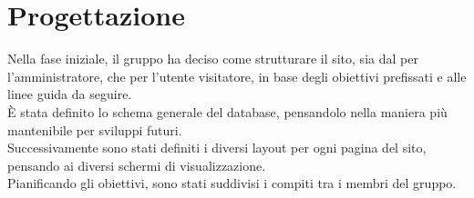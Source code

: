 \section{Progettazione}
Nella fase iniziale, il gruppo ha deciso come strutturare il sito, sia dal per l'amministratore, che per l'utente visitatore, in base degli obiettivi prefissati e alle linee guida da seguire.\\
È stata definito lo schema generale del database, pensandolo nella maniera più mantenibile per sviluppi futuri. \\
Successivamente sono stati definiti i diversi layout per ogni pagina del sito, pensando ai diversi schermi di visualizzazione.\\Pianificando gli obiettivi, sono stati suddivisi i compiti tra i membri del gruppo.


